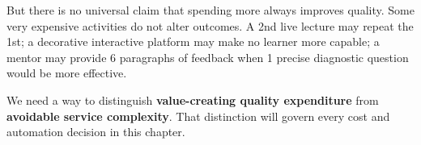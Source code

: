 But there is no universal claim that spending more always improves quality. Some very expensive activities do not alter outcomes. A 2nd live lecture may repeat the 1st; a decorative interactive platform may make no learner more capable; a mentor may provide 6 paragraphs of feedback when 1 precise diagnostic question would be more effective.

We need a way to distinguish \textbf{value-creating quality expenditure} from \textbf{avoidable service complexity}. That distinction will govern every cost and automation decision in this chapter.
